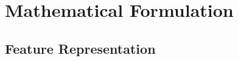 \documentclass[10pt]{beamer}
\begin{document}
\section{Mathematical Formulation}
\subsection{Feature Representation}





\end{document}
